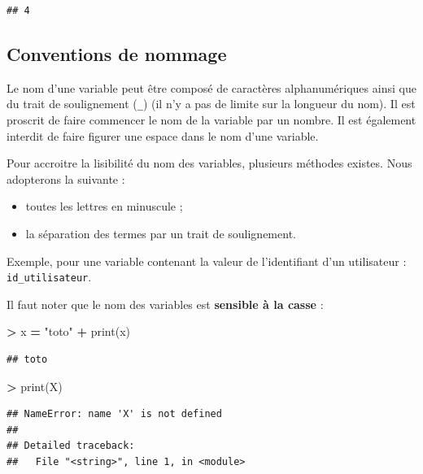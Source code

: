 \documentclass[12pt,]{book}
\newenvironment{Shaded}{\begin{snugshade}}{\end{snugshade}}
\newcommand{\StringTok}[1]{\textcolor[rgb]{0.31,0.60,0.02}{#1}}
\newcommand{\OperatorTok}[1]{\textcolor[rgb]{0.81,0.36,0.00}{\textbf{#1}}}
\newcommand{\BuiltInTok}[1]{#1}
\newcommand{\NormalTok}[1]{#1}
\providecommand{\tightlist}{%
  \setlength{\itemsep}{0pt}\setlength{\parskip}{0pt}}
\numberwithin{equation}{section}
\numberwithin{countremarque}{section}
\begin{document}
\begin{lstlisting}
## 4
\end{lstlisting}

\subsection{Conventions de nommage}\label{conventions-de-nommage}

Le nom d'une variable peut être composé de caractères alphanumériques
ainsi que du trait de soulignement (\texttt{\_}) (il n'y a pas de limite
sur la longueur du nom). Il est proscrit de faire commencer le nom de la
variable par un nombre. Il est également interdit de faire figurer une
espace dans le nom d'une variable.

Pour accroitre la lisibilité du nom des variables, plusieurs méthodes
existes. Nous adopterons la suivante :

\begin{itemize}
\tightlist
\item
  toutes les lettres en minuscule ;
\item
  la séparation des termes par un trait de soulignement.
\end{itemize}

Exemple, pour une variable contenant la valeur de l'identifiant d'un
utilisateur : \texttt{id\_utilisateur}.

Il faut noter que le nom des variables est \textbf{sensible à la casse}
:

\begin{Shaded}
\begin{Highlighting}[]
\OperatorTok{>}\NormalTok{ x }\OperatorTok{=} \StringTok{"toto"}
\OperatorTok{+} \BuiltInTok{print}\NormalTok{(x)}
\end{Highlighting}
\end{Shaded}

\begin{lstlisting}
## toto
\end{lstlisting}

\begin{Shaded}
\begin{Highlighting}[]
\OperatorTok{>} \BuiltInTok{print}\NormalTok{(X)}
\end{Highlighting}
\end{Shaded}

\begin{lstlisting}
## NameError: name 'X' is not defined
## 
## Detailed traceback: 
##   File "<string>", line 1, in <module>
\end{lstlisting}
\end{document}
